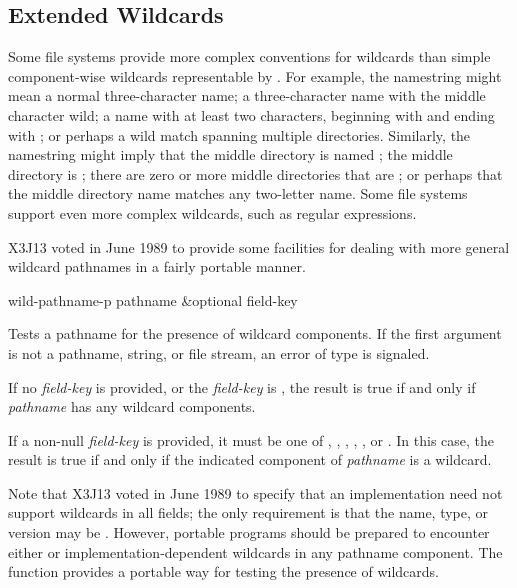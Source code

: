\begin{newer}
\subsection{Extended Wildcar{\kern-1pt}ds}
\label{WILD-PATHNAME-SECTION}


  Some file systems provide more complex conventions for wildcards than
  simple component-wise wildcards representable by .
For example, the namestring  might mean a normal three-character
name; a three-character name with the middle character wild;
a name with at least two characters, beginning with  and ending with ;
or perhaps a wild match spanning multiple directories.  Similarly, the
namestring  might imply that the middle directory is
named ; the middle directory is ;
there are zero or more middle directories that are ;
or perhaps that the middle directory name matches any two-letter name.
Some file systems support even more complex wildcards, such as
  regular expressions.

X3J13 voted in June 1989  to provide
some facilities for dealing with more general wildcard pathnames
in a fairly portable manner.

\begin{defun}[Function]
wild-pathname-p pathname &optional field-key
  
    Tests a pathname for the presence of wildcard components.  If the first
    argument is not a pathname, string, or file stream, an error of type
     is signaled.
  
    If no {\it field-key} is provided, or the {\it field-key} is , the result is
    true if and only if {\it pathname} has any wildcard components.

    If a non-null {\it field-key} is provided, it must be one of , ,
    , , , or .
    In this case, the result is true if and only
    if the indicated component of {\it pathname} is a wildcard.

    Note that X3J13 voted in June 1989 
    to specify that an implementation need not support wildcards in all fields;
    the only requirement is that the name, type, or version may be .
    However, portable programs should be prepared to encounter either 
    or implementation-dependent wildcards in any pathname component.
    The function  provides a portable way for testing
    the presence of wildcards.
\end{defun}


\end{newer}
